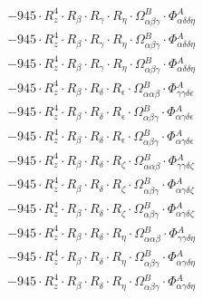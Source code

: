 \documentclass{article}
\begin{document}
\begin{subequations}
\begin{gather}
\begin{array}{c}
 \\[0.2em] 		 - 945 \cdot R_{z}^{4} \cdot R_{\beta{}} \cdot R_{\gamma{}} \cdot R_{\eta{}} \cdot \Omega{}^{B}_{\alpha{}\beta{}\gamma{}} \cdot \Phi{}^{A}_{\alpha{}\delta{}\delta{}\eta{}} 
 \\[0.2em] 		 - 945 \cdot R_{z}^{4} \cdot R_{\beta{}} \cdot R_{\gamma{}} \cdot R_{\eta{}} \cdot \Omega{}^{B}_{\alpha{}\beta{}\gamma{}} \cdot \Phi{}^{A}_{\alpha{}\delta{}\delta{}\eta{}} 
 \\[0.2em] 		 - 945 \cdot R_{z}^{4} \cdot R_{\beta{}} \cdot R_{\gamma{}} \cdot R_{\eta{}} \cdot \Omega{}^{B}_{\alpha{}\beta{}\gamma{}} \cdot \Phi{}^{A}_{\alpha{}\delta{}\delta{}\eta{}} 
 \\[0.2em] 		 - 945 \cdot R_{z}^{4} \cdot R_{\beta{}} \cdot R_{\delta{}} \cdot R_{\epsilon{}} \cdot \Omega{}^{B}_{\alpha{}\alpha{}\beta{}} \cdot \Phi{}^{A}_{\gamma{}\gamma{}\delta{}\epsilon{}} 
 \\[0.2em] 		 - 945 \cdot R_{z}^{4} \cdot R_{\beta{}} \cdot R_{\delta{}} \cdot R_{\epsilon{}} \cdot \Omega{}^{B}_{\alpha{}\beta{}\gamma{}} \cdot \Phi{}^{A}_{\alpha{}\gamma{}\delta{}\epsilon{}} 
 \\[0.2em] 		 - 945 \cdot R_{z}^{4} \cdot R_{\beta{}} \cdot R_{\delta{}} \cdot R_{\epsilon{}} \cdot \Omega{}^{B}_{\alpha{}\beta{}\gamma{}} \cdot \Phi{}^{A}_{\alpha{}\gamma{}\delta{}\epsilon{}} 
 \\[0.2em] 		 - 945 \cdot R_{z}^{4} \cdot R_{\beta{}} \cdot R_{\delta{}} \cdot R_{\zeta{}} \cdot \Omega{}^{B}_{\alpha{}\alpha{}\beta{}} \cdot \Phi{}^{A}_{\gamma{}\gamma{}\delta{}\zeta{}} 
 \\[0.2em] 		 - 945 \cdot R_{z}^{4} \cdot R_{\beta{}} \cdot R_{\delta{}} \cdot R_{\zeta{}} \cdot \Omega{}^{B}_{\alpha{}\beta{}\gamma{}} \cdot \Phi{}^{A}_{\alpha{}\gamma{}\delta{}\zeta{}} 
 \\[0.2em] 		 - 945 \cdot R_{z}^{4} \cdot R_{\beta{}} \cdot R_{\delta{}} \cdot R_{\zeta{}} \cdot \Omega{}^{B}_{\alpha{}\beta{}\gamma{}} \cdot \Phi{}^{A}_{\alpha{}\gamma{}\delta{}\zeta{}} 
 \\[0.2em] 		 - 945 \cdot R_{z}^{4} \cdot R_{\beta{}} \cdot R_{\delta{}} \cdot R_{\eta{}} \cdot \Omega{}^{B}_{\alpha{}\alpha{}\beta{}} \cdot \Phi{}^{A}_{\gamma{}\gamma{}\delta{}\eta{}} 
 \\[0.2em] 		 - 945 \cdot R_{z}^{4} \cdot R_{\beta{}} \cdot R_{\delta{}} \cdot R_{\eta{}} \cdot \Omega{}^{B}_{\alpha{}\beta{}\gamma{}} \cdot \Phi{}^{A}_{\alpha{}\gamma{}\delta{}\eta{}} 
 \\[0.2em] 		 - 945 \cdot R_{z}^{4} \cdot R_{\beta{}} \cdot R_{\delta{}} \cdot R_{\eta{}} \cdot \Omega{}^{B}_{\alpha{}\beta{}\gamma{}} \cdot \Phi{}^{A}_{\alpha{}\gamma{}\delta{}\eta{}} 

\end{array}
\end{gather}
\end{subequations}
\end{document}
